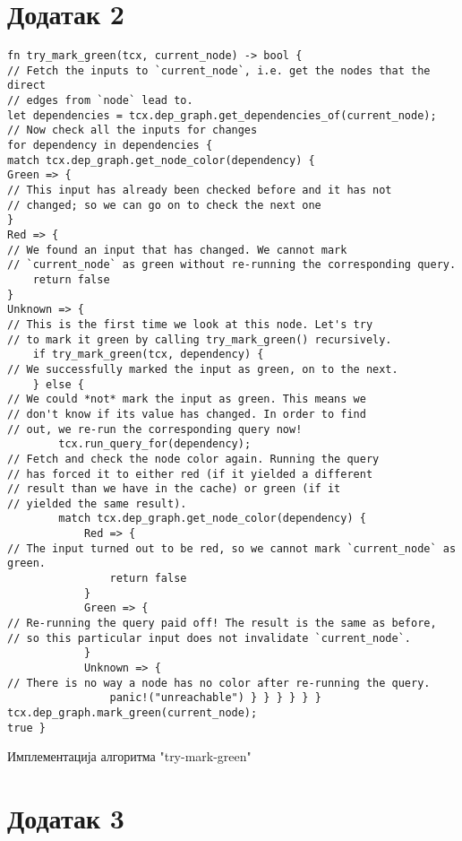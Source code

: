 \section{Додатак 2}
\begin{listing}[H]
\begin{verbatim}
fn try_mark_green(tcx, current_node) -> bool {
// Fetch the inputs to `current_node`, i.e. get the nodes that the direct
// edges from `node` lead to.
let dependencies = tcx.dep_graph.get_dependencies_of(current_node);
// Now check all the inputs for changes
for dependency in dependencies {
match tcx.dep_graph.get_node_color(dependency) {
Green => {
// This input has already been checked before and it has not
// changed; so we can go on to check the next one
}
Red => {
// We found an input that has changed. We cannot mark
// `current_node` as green without re-running the corresponding query.
    return false
}
Unknown => {
// This is the first time we look at this node. Let's try
// to mark it green by calling try_mark_green() recursively.
    if try_mark_green(tcx, dependency) {
// We successfully marked the input as green, on to the next.
    } else {
// We could *not* mark the input as green. This means we
// don't know if its value has changed. In order to find
// out, we re-run the corresponding query now!
        tcx.run_query_for(dependency);
// Fetch and check the node color again. Running the query
// has forced it to either red (if it yielded a different
// result than we have in the cache) or green (if it
// yielded the same result).
        match tcx.dep_graph.get_node_color(dependency) {
            Red => {
// The input turned out to be red, so we cannot mark `current_node` as green.
                return false
            }
            Green => {
// Re-running the query paid off! The result is the same as before, 
// so this particular input does not invalidate `current_node`.
            }
            Unknown => {
// There is no way a node has no color after re-running the query.
                panic!("unreachable") } } } } } }
tcx.dep_graph.mark_green(current_node);
true }
\end{verbatim}
\caption{Имплементација алгоритма "try-mark-green"}
\label{lst:bonus_try_mark_green}
\end{listing}

\section{Додатак 3}

